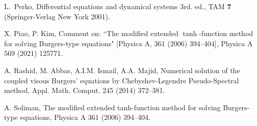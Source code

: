 \documentclass{amsart}
\theoremstyle{definition}
\numberwithin{equation}{section}
\begin{document}
\begin{thebibliography}{10}
       
        
        
        {\sc L.~Perko}, 
        {Differential equations and dynamical systems 3rd. ed.}, 
        TAM {\bf 7} (Springer-Verlag New York 2001).
        
    
        
        {X. Piao, P. Kim},
        {Comment on: ``The modified extended $\tanh$-function method for solving Burgers-type equations" [Physica A, 361 (2006) 394--404]},
        Physica A 569 (2021) 125771.

        {A. Rashid, M. Abbas, A.I.M. Ismail, A.A. Majid},
        {Numerical solution of the coupled visous Burgers' equations by Chebyshev-Legendre Pseudo-Spectral method},
        Appl. Math. Comput. 245 (2014) 372--381.       
        
        
        {A. Soliman},
        {The modified extended tanh-function method for solving Burgers-type equations},
        Physica A 361 (2006) 394--404.








\end{thebibliography}
\end{document}
